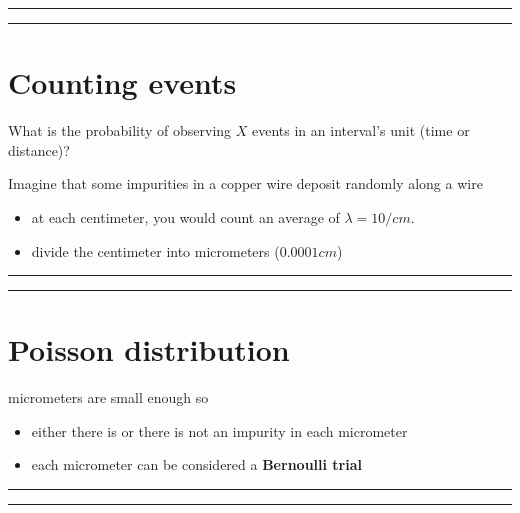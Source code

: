 \documentclass[
]{book}
\providecommand{\tightlist}{%
  \setlength{\itemsep}{0pt}\setlength{\parskip}{0pt}}
\begin{document}
\begin{center}\rule{0.5\linewidth}{0.5pt}\end{center}

\begin{center}\rule{0.5\linewidth}{0.5pt}\end{center}

\hypertarget{counting-events-1}{%
\section{Counting events}\label{counting-events-1}}

What is the probability of observing \(X\) events in an interval's unit (time or distance)?

Imagine that some impurities in a copper wire deposit randomly along a wire

\begin{itemize}
\tightlist
\item
  at each centimeter, you would count an average of \(\lambda=10/cm\).
\item
  divide the centimeter into micrometers (\(0.0001cm\))
\end{itemize}

\begin{center}\rule{0.5\linewidth}{0.5pt}\end{center}

\begin{center}\rule{0.5\linewidth}{0.5pt}\end{center}

\hypertarget{poisson-distribution}{%
\section{Poisson distribution}\label{poisson-distribution}}

micrometers are small enough so

\begin{itemize}
\tightlist
\item
  either there is or there is not an impurity in each micrometer
\item
  each micrometer can be considered a \textbf{Bernoulli trial}
\end{itemize}

\begin{center}\rule{0.5\linewidth}{0.5pt}\end{center}

\begin{center}\rule{0.5\linewidth}{0.5pt}\end{center}
\end{document}
